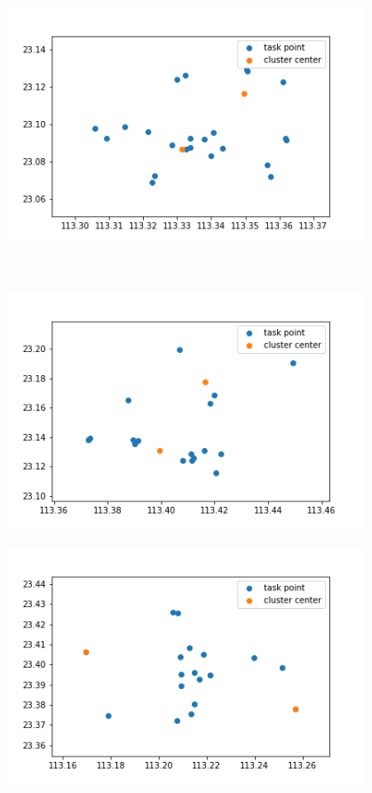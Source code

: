 \begin{figure}
\begin{minipage}[c]{0.3\textwidth}
        \label{fig:sample-figure-b}
    \end{minipage}
    \begin{minipage}[c]{0.3\textwidth}
        \centering
        \includegraphics[width=0.95\textwidth]{120.png}
        \label{fig:sample-figure-c}
    \end{minipage}\\    \begin{minipage}[c]{0.3\textwidth}
        \centering
        \includegraphics[width=0.95\textwidth]{128.png}
        \label{fig:sample-figure-a}
    \end{minipage}
    \begin{minipage}[c]{0.3\textwidth}
        \centering
        \includegraphics[width=0.95\textwidth]{140.png}

\end{minipage}
\end{figure}
